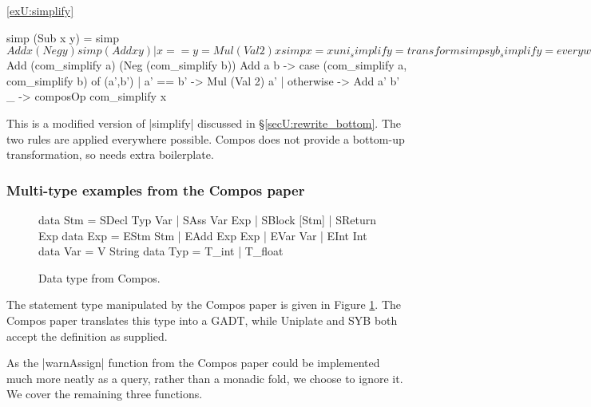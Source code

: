 \begin{examplerevisit}{\ref{exU:simplify}}

\ignore\begin{code}
simp (Sub x y)           = simp $ Add x (Neg y)
simp (Add x y) | x == y  = Mul (Val 2) x
simp x                   = x

uni_simplify = transform simp

syb_simplify = everywhere (mkT simp)

com_simplify :: Expr a -> Expr a
com_simplify x = case x of
    Sub  a b -> com_simplify $ Add (com_simplify a) (Neg (com_simplify b))
    Add  a b -> case  (com_simplify a, com_simplify b) of
                      (a',b')  | a' == b'   -> Mul (Val 2) a'
                               | otherwise  -> Add a' b'
    _ -> composOp com_simplify x
\end{code}

This is a modified version of |simplify| discussed in \S\ref{secU:rewrite_bottom}. The two rules are applied everywhere possible. Compos does not provide a bottom-up transformation, so needs extra boilerplate.
\end{examplerevisit}

\subsubsection{Multi-type examples from the Compos paper}

\begin{figure}
\ignore\begin{code}
data Stm  =  SDecl    Typ Var   | SAss     Var Exp
          |  SBlock   [Stm]     | SReturn  Exp
data Exp  =  EStm  Stm          |  EAdd  Exp Exp
          |  EVar  Var          |  EInt  Int
data Var  =  V String
data Typ  =  T_int              | T_float
\end{code}
\caption{Data type from Compos.}
\label{figU:compos}
\end{figure}

The statement type manipulated by the Compos paper is given in Figure \ref{figU:compos}. The Compos paper translates this type into a GADT, while Uniplate and SYB both accept the definition as supplied.

As the |warnAssign| function from the Compos paper could be implemented much more neatly as a query, rather than a monadic fold, we choose to ignore it. We cover the remaining three functions.

